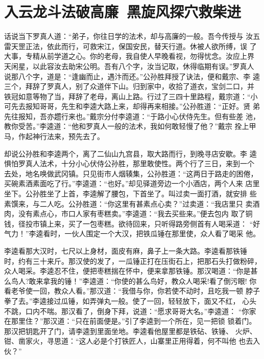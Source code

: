 \chapter{入云龙斗法破高廉~黑旋风探穴救柴进}

话说当下罗真人道：“弟子，你往日学的法术，却与高廉的一般。吾今传授与
汝五雷天罡正法，依此而行，可救宋江，保国安民，替天行道。休被人欲所缚，误
了大事，专精从前学道之心。你的老母，我自使人早晚看视，勿得忧念。汝应上界
天闲星，以此容汝去助宋公明。吾有八个字，汝当记取，休得临期有误。”罗真人
说那八个字，道是：“逢幽而止，遇汴而还。”公孙胜拜授了诀法，便和戴宗、李
逵三个，拜辞了罗真人，别了众道伴下山。归到家中，收拾了道衣，宝剑二口，并
铁冠如意等物了当，拜辞了老母，离山上路。行过了三四十里路程，戴宗道：“小
可先去报知哥哥，先生和李逵大路上来，却得再来相接。”公孙胜道：“正好。贤
弟先往报知，吾亦趱行来也。”戴宗分付李逵道：“于路小心伏侍先生。但有些差
池，教你受苦。”李逵道：“他和罗真人一般的法术，我如何敢轻慢了他？”戴宗
拴上甲马，作起神行法来，预先去了。

却说公孙胜和李逵两个，离了二仙山九宫县，取大路而行，到晚寻店安歇。李
逵惧怕罗真人法术，十分小心伏侍公孙胜，那里敢使性。两个行了三日，来到一个
去处，地名唤做武冈镇。只见街市人烟辏集，公孙胜道：“这两日于路走的困倦，
买碗素酒素面吃了行。”李逵道：“也好。”却见驿道旁边一个小酒店，两个人来
店里坐下。公孙胜坐了上首，李逵解了腰包，下首坐了。叫过卖一面打酒，就安排
些素馔来，与二人吃。公孙胜道：“你这里有甚素点心卖？”过卖道：“我店里只
卖酒肉，没有素点心，市口人家有枣糕卖。”李逵道：“我去买些来。”便去包内
取了铜钱，径投市镇上来，买了一包枣糕。欲待回来，只听得路旁侧首有人喝采道：
“好气力！”李逵看时，一伙人围定一个大汉，把铁瓜锤在那里使，众人看了喝采
他。

李逵看那大汉时，七尺以上身材，面皮有麻，鼻子上一条大路。李逵看那铁锤
时，约有三十来斤。那汉使的发了，一瓜锤正打在压街石上，把那石头打做粉碎，
众人喝采。李逵忍不住，便把枣糕揣在怀中，便来拿那铁锤。那汉喝道：“你是甚
么鸟人?敢来拿我的锤！”李逵道：“你使的甚么鸟好，教众人喝采!看了倒污眼!
你看老爷使一回，教众人看。”那汉道：“我借与你，你若使不动时，且吃我一顿
脖子拳了去。”李逵接过瓜锤，如弄弹丸一般。使了一回，轻轻放下，面又不红，
心头不跳，口内不喘。那汉看了，倒身下拜，说道：“愿求哥哥大名。”李逵道：
“你家在那里住？”那汉道：“只在前面便是。”引了李逵到一个所在，见一把锁
锁着门。那汉把钥匙开了门，请李逵到里面坐地。李逵看他屋里都是铁砧、铁锤、
火炉、钳、凿家火，寻思道：“这人必是个打铁匠人，山寨里正用得着，何不叫他
也去入伙？”

